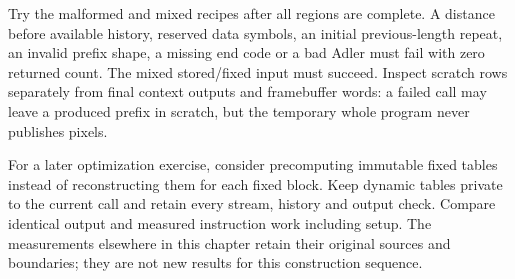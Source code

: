 Try the malformed and mixed recipes after all regions are complete. A distance before
available history, reserved data symbols, an initial previous-length repeat, an invalid
prefix shape, a missing end code or a bad Adler must fail with zero returned count.
The mixed stored/fixed input must succeed. Inspect scratch rows separately from final
context outputs and framebuffer words: a failed call may leave a produced prefix in
scratch, but the temporary whole program never publishes pixels.

For a later optimization exercise, consider precomputing immutable fixed tables instead
of reconstructing them for each fixed block. Keep dynamic tables private to the current
call and retain every stream, history and output check. Compare identical output and
measured instruction work including setup. The measurements elsewhere in this chapter
retain their original sources and boundaries; they are not new results for this
construction sequence.
